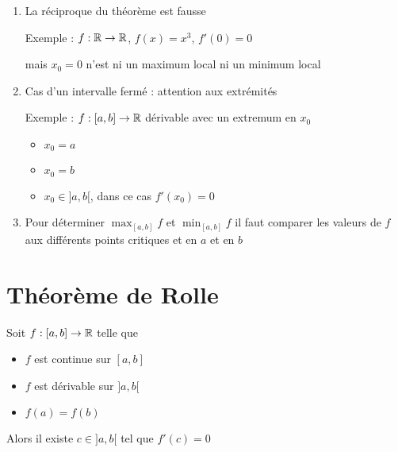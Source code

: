 \begin{frame}
\begin{enumerate}
  \item La réciproque du théorème est fausse
\pause

Exemple : $f : \mathbb{R} \to \mathbb{R}$, $f(x)= x^3$, $f'(0)=0$ 
\pause

mais $x_0=0$ n'est ni un maximum local ni un minimum local

\pause

  \item Cas d'un intervalle fermé : attention aux extrémités

\pause

Exemple : $f : [a,b] \to \mathbb{R}$  dérivable avec un extremum en $x_0$
\begin{itemize}
  \item $x_0= a$
  \item $x_0 =b$
  \item $x_0 \in ]a,b[$, dans ce cas $f'(x_0)=0$
\end{itemize}

\pause

  \item Pour déterminer $\max_{[a,b]} f$ et $\min_{[a,b]} f$ 
 il faut comparer les valeurs de $f$ aux différents points critiques et en $a$ et en $b$

\pause
{}  

\end{enumerate}
\end{frame}






\section*{Théorème de Rolle}


\begin{frame}
\begin{theoreme}[de Rolle]
\label{th:rolle}
Soit $f:[a,b] \to \mathbb{R}$ telle que 

\begin{itemize}
  \item $f$ est continue sur $[a,b]$

  \item $f$ est dérivable sur $]a,b[$

  \item $f(a)=f(b)$
\end{itemize}

Alors il existe $c \in ]a,b[$  tel que $f'(c)=0$
\end{theoreme}
\pause
{}  

\end{frame}

